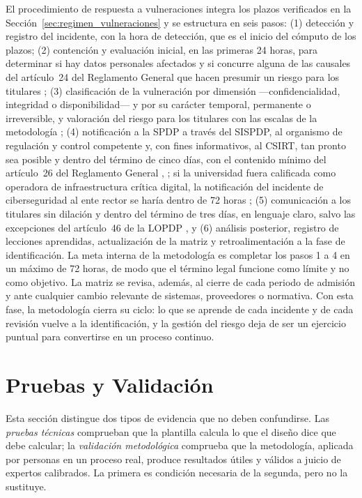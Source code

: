 El procedimiento de respuesta a vulneraciones integra los plazos verificados en la Sección~\ref{sec:regimen_vulneraciones} y se estructura en seis pasos: (1) detección y registro del incidente, con la hora de detección, que es el inicio del cómputo de los plazos; (2) contención y evaluación inicial, en las primeras 24 horas, para determinar si hay datos personales afectados y si concurre alguna de las causales del artículo~24 del Reglamento General que hacen presumir un riesgo para los titulares \cite[art.~24]{rlopdp2023}; (3) clasificación de la vulneración por dimensión ---confidencialidad, integridad o disponibilidad--- y por su carácter temporal, permanente o irreversible, y valoración del riesgo para los titulares con las escalas de la metodología \cite{spdp2026vulneraciones}; (4) notificación a la SPDP a través del SISPDP, al organismo de regulación y control competente y, con fines informativos, al CSIRT, tan pronto sea posible y dentro del término de cinco días, con el contenido mínimo del artículo~26 del Reglamento General \cite[art.~43]{lopdp2021}, \cite[art.~26]{rlopdp2023}; si la universidad fuera calificada como operadora de infraestructura crítica digital, la notificación del incidente de ciberseguridad al ente rector se haría dentro de 72 horas \cite{lofc2026}; (5) comunicación a los titulares sin dilación y dentro del término de tres días, en lenguaje claro, salvo las excepciones del artículo~46 de la LOPDP \cite[art.~46]{lopdp2021}, y (6) análisis posterior, registro de lecciones aprendidas, actualización de la matriz y retroalimentación a la fase de identificación. La meta interna de la metodología es completar los pasos 1 a 4 en un máximo de 72 horas, de modo que el término legal funcione como límite y no como objetivo. La matriz se revisa, además, al cierre de cada periodo de admisión y ante cualquier cambio relevante de sistemas, proveedores o normativa. Con esta fase, la metodología cierra su ciclo: lo que se aprende de cada incidente y de cada revisión vuelve a la identificación, y la gestión del riesgo deja de ser un ejercicio puntual para convertirse en un proceso continuo.

\section{Pruebas y Validación}

Esta sección distingue dos tipos de evidencia que no deben confundirse. Las \textit{pruebas técnicas} comprueban que la plantilla calcula lo que el diseño dice que debe calcular; la \textit{validación metodológica} comprueba que la metodología, aplicada por personas en un proceso real, produce resultados útiles y válidos a juicio de expertos calibrados. La primera es condición necesaria de la segunda, pero no la sustituye.

